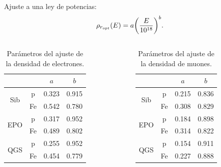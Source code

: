 \documentclass[11pt,table,compress]{beamer}
\begin{document}
	\begin{frame}
	Ajuste a una ley de potencias:
	\begin{align*} \label{powerlaw}
	\rho_{r_{opt}}(E) = a \qty(\frac{E}{10^{18}})^b.
	\end{align*}
		\begin{columns}
			\begin{column}{0.5\textwidth}
				\begin{table}[] 
				\centering
				\caption{Parámetros del ajuste de la densidad de electrones.}
				\begin{tabular}{c|c|cc}
				                     &  & $a$ & $b$   \\ \hline
				\multirow{2}{*}{Sib} & p     & 0.323     & 0.915 \\
				                             & Fe    & 0.542     & 0.780 \\ \hline
				\multirow{2}{*}{EPO}    & p     & 0.317     & 0.952 \\
				                             & Fe    & 0.489     & 0.802 \\ \hline
				\multirow{2}{*}{QGS} & p     & 0.255     & 0.952 \\
				                             & Fe    & 0.454     & 0.779 \\ \hline
				\end{tabular}
				\label{edensity_params}
				\end{table}
			\end{column}
			\begin{column}{0.5\textwidth}
				\begin{table}[] 
				\centering
				\caption{Parámetros del ajuste de la densidad de muones.}
				\begin{tabular}{c|c|cc}
				                   &  & $a$ 		 & $b$   \\ \hline
				\multirow{2}{*}{Sib} & p     & 0.215     & 0.836 \\
				                             & Fe    & 0.308     & 0.829 \\ \hline
				\multirow{2}{*}{EPO}    & p     & 0.184     & 0.898 \\
				                             & Fe    & 0.314     & 0.822 \\ \hline
				\multirow{2}{*}{QGS} & p     & 0.154     & 0.911 \\
				                             & Fe    & 0.227     & 0.888 \\ \hline
				\end{tabular}
				\label{mudensity_params}
				\end{table}
			\end{column}
		\end{columns}
	\end{frame}
\end{document}
